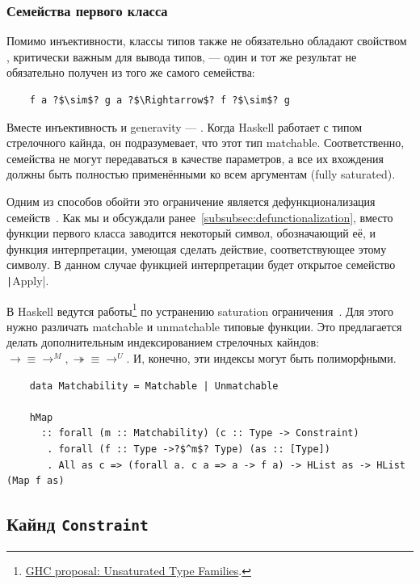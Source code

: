 \subsubsection{Семейства первого класса}

Помимо инъективности, классы типов также не обязательно обладают свойством , критически важным для вывода типов, --- один и тот же результат не обязательно получен из того же самого семейства:
\begin{verbatim}
    f a ?$\sim$? g a ?$\Rightarrow$? f ?$\sim$? g
\end{verbatim}

Вместе инъективность и generavity --- .
Когда Haskell работает с типом стрелочного кайнда, он подразумевает, что этот тип matchable.
Соответственно, семейства не могут передаваться в качестве параметров, а все их вхождения должны быть полностью применёнными ко всем аргументам (fully saturated).

Одним из способов обойти это ограничение является дефункционализация семейств~\cite{defunctionalization-slides, eisenberg2014promoting}.
Как мы и обсуждали ранее~\ref{subsubsec:defunctionalization}, вместо функции первого класса заводится некоторый символ, обозначающий её, и функция интерпретации, умеющая сделать действие, соответствующее этому символу.
В данном случае функцией интерпретации будет открытое семейство \texttt|Apply|.

В Haskell ведутся работы\footnote{\href{https://ghc-proposals.readthedocs.io/en/latest/proposals/0242-unsaturated-type-families.html}{GHC proposal: Unsaturated Type Families}.} по устранению saturation ограничения~\cite{kiss2019higher}.
Для этого нужно различать matchable и unmatchable типовые функции.
Это предлагается делать дополнительным индексированием стрелочных кайндов: $\to \equiv
\to^M, \twoheadrightarrow \equiv \to^U$.
И, конечно, эти индексы могут быть полиморфными.

\begin{verbatim}
    data Matchability = Matchable | Unmatchable

    hMap
      :: forall (m :: Matchability) (c :: Type -> Constraint)
       . forall (f :: Type ->?$^m$? Type) (as :: [Type])
       . All as c => (forall a. c a => a -> f a) -> HList as -> HList (Map f as)
\end{verbatim}

\subsection{Кайнд \texttt{Constraint}}

